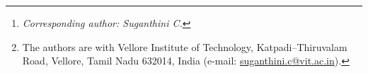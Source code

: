 \author{Advay~Vivek, Kaavish~Gogia, and Suganthini~C%
\thanks{\textit{Corresponding author: Suganthini C.}}%
\thanks{The authors are with Vellore Institute of Technology, Katpadi--Thiruvalam Road, Vellore, Tamil Nadu 632014, India (e-mail: \href{mailto:suganthini.c@vit.ac.in}{suganthini.c@vit.ac.in}).}}
